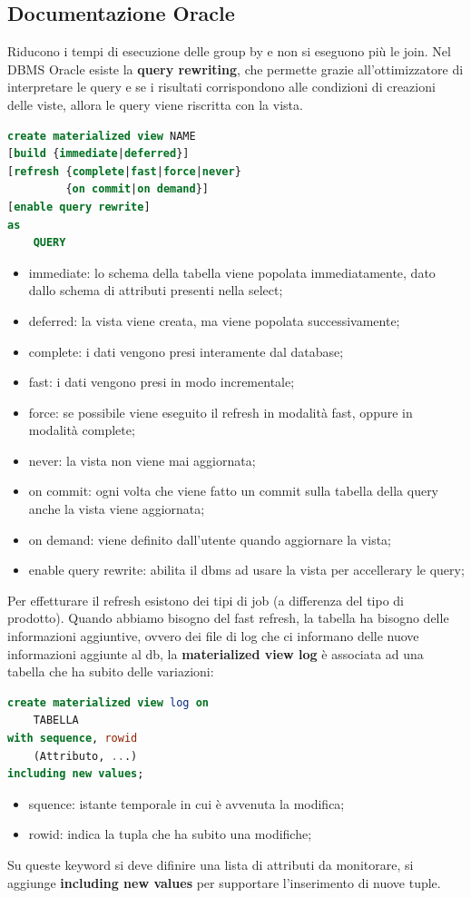 \documentclass[12pt]{article}
\begin{document}
\subsection{Documentazione Oracle}
Riducono i tempi di esecuzione delle group by e non si eseguono pi\`u le join. Nel DBMS Oracle esiste la \textbf{query rewriting}, che permette grazie all'ottimizzatore di interpretare le query e se i risultati corrispondono alle condizioni di creazioni delle viste, allora le query viene riscritta con la vista.
\begin{lstlisting}[language=sql]
create materialized view NAME
[build {immediate|deferred}]
[refresh {complete|fast|force|never}
         {on commit|on demand}]
[enable query rewrite]
as
    QUERY
\end{lstlisting}
\begin{itemize}
    \item immediate: lo schema della tabella viene popolata immediatamente, dato dallo schema di attributi presenti nella select;
    \item deferred: la vista viene creata, ma viene popolata successivamente;
    \item complete: i dati vengono presi interamente dal database;
    \item fast: i dati vengono presi in modo incrementale;
    \item force: se possibile viene eseguito il refresh in modalit\`a fast, oppure in modalit\`a complete;
    \item never: la vista non viene mai aggiornata;
    \item on commit: ogni volta che viene fatto un commit sulla tabella della query anche la vista viene aggiornata;
    \item on demand: viene definito dall'utente quando aggiornare la vista;
    \item enable query rewrite: abilita il dbms ad usare la vista per accellerary le query;
\end{itemize}

Per effetturare il refresh esistono dei tipi di job (a differenza del tipo di prodotto). Quando abbiamo bisogno del fast refresh, la tabella ha bisogno delle informazioni aggiuntive, ovvero dei file di log che ci informano delle nuove informazioni aggiunte al db, la \textbf{materialized view log} \`e associata ad una tabella che ha subito delle variazioni:
\begin{lstlisting}[language=sql]
create materialized view log on
    TABELLA
with sequence, rowid
    (Attributo, ...)
including new values;
\end{lstlisting}
\begin{itemize}
    \item squence: istante temporale in cui \`e avvenuta la modifica;
    \item rowid: indica la tupla che ha subito una modifiche;
\end{itemize}
Su queste keyword si deve difinire una lista di attributi da monitorare, si aggiunge \textbf{including new values} per supportare l'inserimento di nuove tuple.
\end{document}
